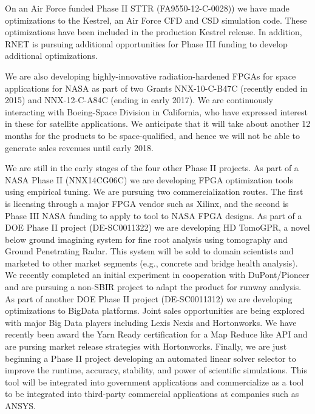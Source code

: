 On an Air Force funded Phase II STTR (FA9550-12-C-0028)) we
have made optimizations to the Kestrel, an Air Force CFD and CSD
simulation code. These optimizations have been included in the
production Kestrel release. In addition, RNET is pursuing additional
opportunities for Phase III funding to develop additional
optimizations.

We are also developing highly-innovative radiation-hardened FPGAs for
space applications for NASA as part of two Grants NNX-10-C-B47C
(recently ended in 2015) and NNX-12-C-A84C (ending in early 2017). We
are continuously interacting with Boeing-Space Division in California,
who have expressed interest in these for satellite applications. We anticipate that it 
will take about another 12 months for the products to be
space-qualified, and hence we will not be able to generate sales revenues until
early 2018. 

We are still in the early stages of the four other Phase II
projects. As part of a NASA Phase II (NNX14CG06C) we are developing
FPGA optimization tools using empirical tuning. We are pursuing two
commercialization routes. The first is licensing through a major FPGA
vendor such as Xilinx, and the second is Phase III NASA funding to
apply to tool to NASA FPGA designs. As part of a DOE Phase II project
(DE-SC0011322) we are developing HD TomoGPR, a novel below ground
imagining system for fine root analysis using tomography and Ground
Penetrating Radar. This system will be sold to domain scientists and
marketed to other market segments (e.g., concrete and bridge health
analysis). We recently completed an initial experiment in cooperation
with DuPont/Pioneer and are pursuing a non-SBIR project to adapt the
product for runway analysis. As part of another DOE Phase II project
(DE-SC0011312) we are developing optimizations to BigData
platforms. Joint sales opportunities are being explored with major Big
Data players including Lexis Nexis and Hortonworks. We have recently
been award the Yarn Ready certification for a Map Reduce like API and
are pursing market release strategies with Hortonworks. Finally, we
are just beginning a Phase II project developing an automated linear
solver selector to improve the runtime, accuracy, stability, and power
of scientific simulations. This tool will be integrated into
government applications and commercialize as a tool to be integrated
into third-party commercial applications at companies such as ANSYS.

